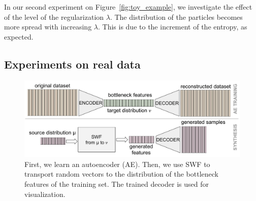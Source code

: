
In our second experiment on Figure~\ref{fig:toy_example}, we investigate the effect of the level of the regularization $\lambda$. The distribution of the particles becomes more spread with increasing $\lambda$. This is due to the increment of the entropy, as expected.

\subsection{Experiments on real data}
\begin{figure}
\centering
\includegraphics[width=0.99\columnwidth]{figures/generating_bottleneck_features.pdf}
\caption{First, we learn an autoencoder (AE). Then, we use SWF to transport random vectors to the distribution of the bottleneck features of the training set. The trained decoder is used for visualization.}
\label{fig:using_ae}
\vspace{-10pt}
\end{figure}


